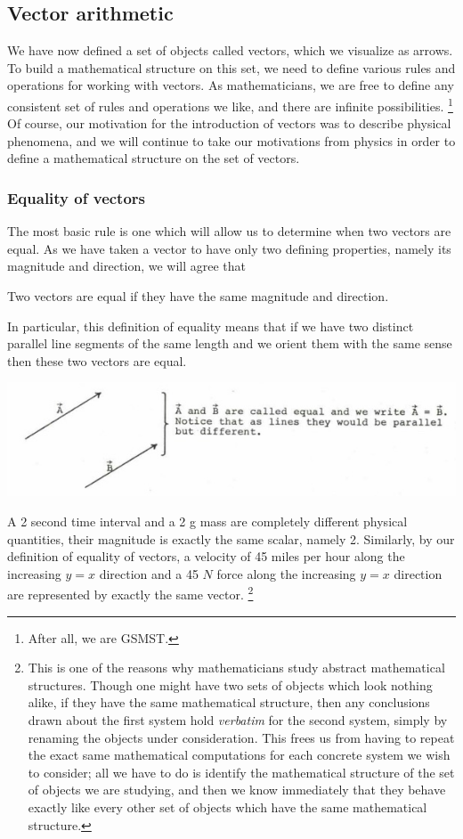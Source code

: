 \documentclass[12pt,letterpaper,reqno]{article}
\numberwithin{equation}{section}
\newcommand{\ti}[1]{\textit{#1}}
\begin{document}
\subsection{Vector arithmetic}
We have now defined a set of objects called vectors, which we visualize as arrows. To build a mathematical structure on this set, we need to define various rules and operations for working with vectors. As mathematicians, we are free to define any consistent set of rules and operations we like, and there are infinite possibilities. \footnote{After all, we are GSMST.} Of course, our motivation for the introduction of vectors was to describe physical phenomena, and we will continue to take our motivations from physics in order to define a mathematical structure on the set of vectors.

\subsubsection{Equality of vectors}
The most basic rule is one which will allow us to determine when two vectors are equal. As we have taken a vector to have only two defining properties, namely its magnitude and direction, we will agree that
\begin{defn}
Two vectors are equal if they have the same magnitude and direction.	
\end{defn}
In particular, this definition of equality means that if we have two distinct parallel line segments of the same length and we orient them with the same sense then these two vectors are equal.
\begin{center}
	\includegraphics[scale=0.5]{figures_mvc/equal_vectors_new}
\end{center}
\begin{example}
A 2 second time interval and a 2 g mass are completely different physical quantities, their magnitude is exactly the same scalar, namely 2. Similarly, by our definition of equality of vectors, a velocity of 45 miles per hour along the increasing $y=x$ direction and a 45 $N$ force along the increasing $y=x$ direction are represented by exactly the same vector. \footnote{This is one of the reasons why mathematicians study abstract mathematical structures. Though one might have two sets of objects which look nothing alike, if they have the same mathematical structure, then any conclusions drawn about the first system hold \ti{verbatim} for the second system, simply by renaming the objects under consideration. This frees us from having to repeat the exact same mathematical computations for each concrete system we wish to consider; all we have to do is identify the mathematical structure of the set of objects we are studying, and then we know immediately that they behave exactly like every other set of objects which have the same mathematical structure.} 
\end{example}
\end{document}
